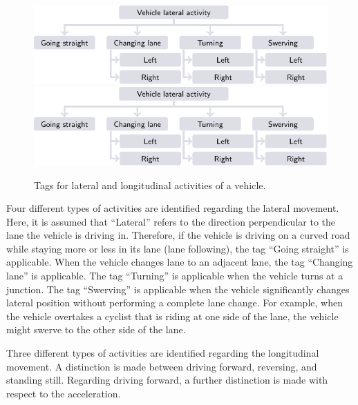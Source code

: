 \begin{figure}[t]
	\centering
	\includegraphics{figures/lat_activity}\\
	\vspace{0.5em}
	\includegraphics{figures/lat_activity}
	\caption{Tags for lateral and longitudinal activities of a vehicle. 
	}
	\label{fig:activities}
\end{figure}

Four different types of activities are identified regarding the lateral movement. Here, it is assumed that ``Lateral'' refers to the direction perpendicular to the lane the vehicle is driving in. Therefore, if the vehicle is driving on a curved road while staying more or less in its lane (lane following), the tag ``Going straight'' is applicable. When the vehicle changes lane to an adjacent lane, the tag ``Changing lane'' is applicable. The tag ``Turning'' is applicable when the vehicle turns at a junction. The tag ``Swerving'' is applicable when the vehicle significantly changes lateral position without performing a complete lane change. For example, when the vehicle overtakes a cyclist that is riding at one side of the lane, the vehicle might swerve to the other side of the lane. 

Three different types of activities are identified regarding the longitudinal movement. A distinction is made between driving forward, reversing, and standing still. Regarding driving forward, a further distinction is made with respect to the acceleration.

